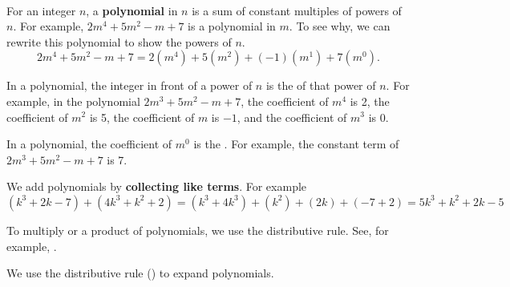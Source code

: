 \begin{defn}[Polynomials]
\label{defn_polynomials}
~
    \begin{apart}
        
        \item For an integer $n$, a \textbf{polynomial} in $n$ is a sum of constant multiples of powers of $n$.  For example, $2m^4+5m^2-m+7$ is a polynomial in $m$.  To see why, we can rewrite this polynomial to show the powers of $n$.
        $$2m^4+5m^2-m+7=2(m^4)+5(m^2)+(-1)(m^1)+7(m^0).$$
        
        \item In a polynomial, the integer in front of a power of $n$ is the  of that power of $n$.  For example, in the polynomial $2m^3+5m^2-m+7$, the coefficient of $m^4$ is 2, the coefficient of $m^2$ is 5, the coefficient of $m$ is $-1$, and the coefficient of $m^3$ is 0.
        
        \item In a polynomial, the coefficient of $m^0$ is the . For example, the constant term of $2m^3+5m^2-m+7$ is 7.

        \item We add polynomials by \textbf{collecting like terms}.  For example $$(k^3 + 2k -7) + (4k^3 + k^2 + 2) = (k^3+4k^3) + (k^2) + (2k) + (-7 +2) = 5k^3+k^2+2k-5$$
        
        \item To multiply or  a product of polynomials, we use the distributive rule.  See, for example, .
    \end{apart}
\end{defn}

We use the distributive rule ()
to expand polynomials.

